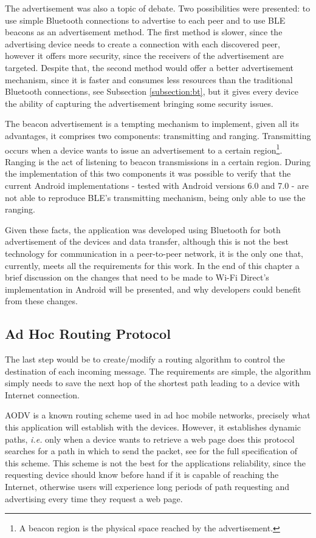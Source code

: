 The advertisement was also a topic of debate. Two possibilities were presented: to use simple Bluetooth connections to advertise to each peer and to use \gls{BLE} beacons as an advertisement method. The first method is slower, since the advertising device needs to create a connection with each discovered peer, however it offers more security, since the receivers of the advertisement are targeted. Despite that, the second method would offer a better advertisement mechanism, since it is faster and consumes less resources than the traditional Bluetooth connections, see Subsection \ref{subsection:bt}, but it gives every device the ability of capturing the advertisement bringing some security issues.

The beacon advertisement is a tempting mechanism to implement, given all its advantages, it comprises two components: transmitting and ranging. Transmitting occurs when a device wants to issue an advertisement to a certain region\footnote{A beacon region is the physical space reached by the advertisement.}. Ranging is the act of listening to beacon transmissions in a certain region. During the implementation of this two components it was possible to verify that the current Android implementations - tested with Android versions 6.0 and 7.0 - are not able to reproduce \gls{BLE}'s transmitting mechanism, being only able to use the ranging.

Given these facts, the application was developed using Bluetooth for both advertisement of the devices and data transfer, although this is not the best technology for communication in a peer-to-peer network, it is the only one that, currently, meets all the requirements for this work. In the end of this chapter a brief discussion on the changes that need to be made to Wi-Fi Direct's implementation in Android will be presented, and why developers could benefit from these changes.

\subsection{Ad Hoc Routing Protocol}
\label{subsec:routprot}

The last step would be to create/modify a routing algorithm to control the destination of each incoming message. The requirements are simple, the algorithm simply needs to save the next hop of the shortest path leading to a device with Internet connection.

\gls{AODV} is a known routing scheme used in ad hoc mobile networks, precisely what this application will establish with the devices. However, it establishes dynamic paths, \textit{i.e.} only when a device wants to retrieve a web page does this protocol searches for a path in which to send the packet, see \cite{aodv} for the full specification of this scheme. This scheme is not the best for the applications reliability, since the requesting device should know before hand if it is capable of reaching the Internet, otherwise users will experience long periods of path requesting and advertising every time they request a web page.

